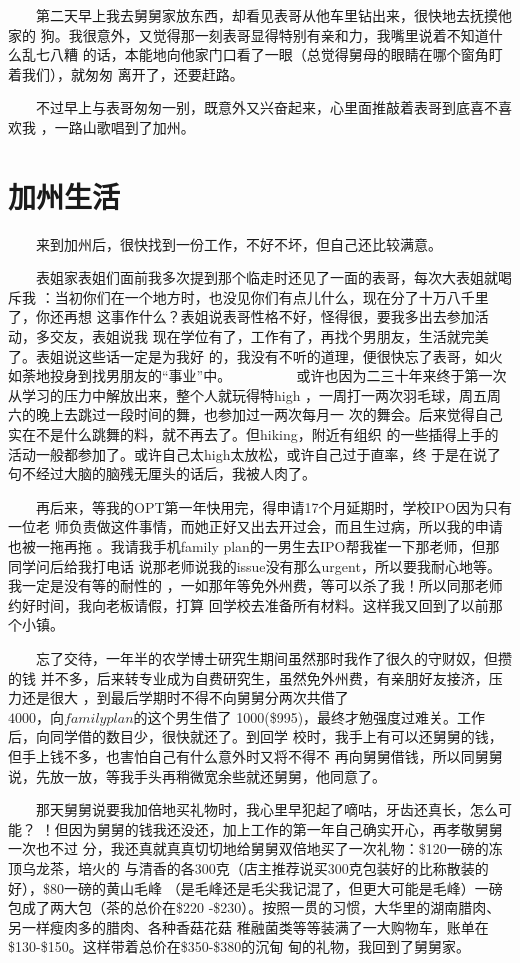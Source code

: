 \documentclass[12pt]{book}
\begin{document}
　　第二天早上我去舅舅家放东西，却看见表哥从他车里钻出来，很快地去抚摸他家的
狗。我很意外，又觉得那一刻表哥显得特别有亲和力，我嘴里说着不知道什么乱七八糟
的话，本能地向他家门口看了一眼（总觉得舅母的眼睛在哪个窗角盯着我们），就匆匆
离开了，还要赶路。

　　不过早上与表哥匆匆一别，既意外又兴奋起来，心里面推敲着表哥到底喜不喜欢我
，一路山歌唱到了加州。 
\section{加州生活}
\label{sec-7-2}

　　来到加州后，很快找到一份工作，不好不坏，但自己还比较满意。

　　表姐家表姐们面前我多次提到那个临走时还见了一面的表哥，每次大表姐就喝斥我
：当初你们在一个地方时，也没见你们有点儿什么，现在分了十万八千里了，你还再想
这事作什么？表姐说表哥性格不好，怪得很，要我多出去参加活动，多交友，表姐说我
现在学位有了，工作有了，再找个男朋友，生活就完美了。表姐说这些话一定是为我好
的，我没有不听的道理，便很快忘了表哥，如火如荼地投身到找男朋友的“事业”中。
　　
　　或许也因为二三十年来终于第一次从学习的压力中解放出来，整个人就玩得特high
，一周打一两次羽毛球，周五周六的晚上去跳过一段时间的舞，也参加过一两次每月一
次的舞会。后来觉得自己实在不是什么跳舞的料，就不再去了。但hiking，附近有组织
的一些插得上手的活动一般都参加了。或许自己太high太放松，或许自己过于直率，终
于是在说了句不经过大脑的脑残无厘头的话后，我被人肉了。

　　再后来，等我的OPT第一年快用完，得申请17个月延期时，学校IPO因为只有一位老
师负责做这件事情，而她正好又出去开过会，而且生过病，所以我的申请也被一拖再拖
。我请我手机family plan的一男生去IPO帮我崔一下那老师，但那同学问后给我打电话
说那老师说我的issue没有那么urgent，所以要我耐心地等。我一定是没有等的耐性的
，一如那年等免外州费，等可以杀了我！所以同那老师约好时间，我向老板请假，打算
回学校去准备所有材料。这样我又回到了以前那个小镇。

　　忘了交待，一年半的农学博士研究生期间虽然那时我作了很久的守财奴，但攒的钱
并不多，后来转专业成为自费研究生，虽然免外州费，有亲朋好友接济，压力还是很大
，到最后学期时不得不向舅舅分两次共借了$4000，向family plan的这个男生借了$
1000(\$995)，最终才勉强度过难关。工作后，向同学借的数目少，很快就还了。到回学
校时，我手上有可以还舅舅的钱，但手上钱不多，也害怕自己有什么意外时又将不得不
再向舅舅借钱，所以同舅舅说，先放一放，等我手头再稍微宽余些就还舅舅，他同意了。

　　那天舅舅说要我加倍地买礼物时，我心里早犯起了嘀咕，牙齿还真长，怎么可能？
！但因为舅舅的钱我还没还，加上工作的第一年自己确实开心，再孝敬舅舅一次也不过
分，我还真就真真切切地给舅舅双倍地买了一次礼物：\$120一磅的冻顶乌龙茶，培火的
与清香的各300克（店主推荐说买300克包装好的比称散装的好），\$80一磅的黄山毛峰
（是毛峰还是毛尖我记混了，但更大可能是毛峰）一磅包成了两大包（茶的总价在\$220
-\$230）。按照一贯的习惯，大华里的湖南腊肉、另一样瘦肉多的腊肉、各种香菇花菇
稚融菌类等等装满了一大购物车，账单在\$130-\$150。这样带着总价在\$350-\$380的沉甸
甸的礼物，我回到了舅舅家。
\end{document}
